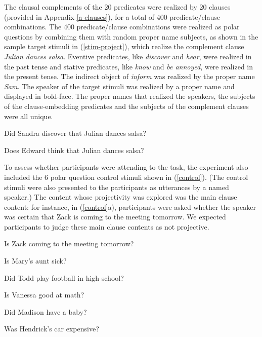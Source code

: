 \documentclass[11pt,fleqn]{article}
\newcommand{\6}{\mbox{$[\hspace*{-.6mm}[$}}
\newcommand{\9}{\mbox{$]\hspace*{-.6mm}]$}}
\begin{document}
The clausal complements of the 20 predicates were realized by 20 clauses (provided in Appendix \ref{a-clauses}), for a total of 400 predicate/clause combinations. The 400 predicate/clause combinations were realized as polar questions by combining them with random proper name subjects, as shown in the sample target stimuli in (\ref{stim-project}), which realize the complement clause {\em Julian dances salsa}. Eventive predicates, like {\em discover} and {\em hear}, were realized in the past tense and stative predicates, like {\em know} and {\em be annoyed}, were realized in the present tense. The indirect object of {\em inform} was realized by the proper name {\em Sam}.  The speaker of the target stimuli was realized by a proper name and displayed in bold-face. The proper names that realized the speakers, the subjects of the clause-embedding predicates and the subjects of the complement clauses were all unique.

\begin{exe}
\ex\label{stim-project} 
\begin{xlist}
 Did Sandra discover that Julian dances salsa?

 Does Edward think that Julian dances salsa?
\end{xlist}
\end{exe}

To assess whether participants were attending to the task, the experiment also included the 6  polar question control stimuli shown in (\ref{control}). (The control stimuli were also presented to the participants as utterances by a named speaker.) The content whose projectivity was explored was the main clause content: for instance, in (\ref{control}a), participants were asked whether the speaker was certain that Zack is coming to the meeting tomorrow. We expected participants to judge these main clause contents as not projective.

\begin{exe}
\ex\label{control} 
\begin{xlist}

\ex   Is Zack coming to the meeting tomorrow?

\ex Is Mary's aunt sick?

\ex Did Todd play football in high school?

\ex Is Vanessa good at math?

\ex Did Madison have a baby?

\ex Was Hendrick's car expensive?

\end{xlist}
\end{exe}
\end{document}
